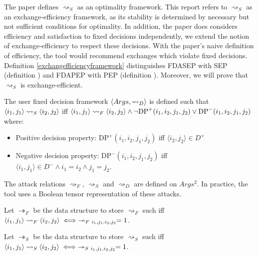 The paper \cite{aes} defines $\rightsquigarrow_S$ as an optimality framework. This report refers to $\rightsquigarrow_S$ as an exchange-efficiency framework, as its stability is determined by necessary but not sufficient conditions for optimality. In addition, the paper does considers efficiency and satisfaction to fixed decisions independently, we extend the notion of exchange-efficiency to respect these decisions. With the paper's naive definition of efficiency, the tool would recommend exchanges which violate fixed decisions. Definition \ref{exchangefficiencyframework} distinguishes FDASEP with SEP (definition \cite{sep}) and FDAPEP with PEP (definition \cite{pep}). Moreover, we will prove that $\rightsquigarrow_S$ is exchange-efficient.

\begin{definition}
	\label{fixeddecisionframework}
	
	The user fixed decision framework $\langle{Args},{\rightsquigarrow_D}\rangle$ is defined such that $\langle{i_1},{j_1}\rangle\rightsquigarrow_S\langle{ i_2},{j_2}\rangle$ iff $\langle{i_1},{j_1}\rangle\rightsquigarrow_F\langle{i_2},{j_2}\rangle\land\neg\text{DP}^+(i_1,i_2,j_1,j_2)\lor\text{DP}^-(i_1,i_2,j_1,j_2)$ where:
	\begin{itemize}
		\item Positive decision property: $\text{DP}^+(i_1,i_2,j_1,j_2)$ iff $\langle i_2, j_2\rangle\in D^+$
		\item Negative decision property: $\text{DP}^-(i_1,i_2,j_1,j_2)$ iff $\langle i_1, j_1\rangle\in D^-\land i_1=i_2\land j_1=j_2$.
	\end{itemize}
\end{definition}

The attack relations $\rightsquigarrow_F$, $\rightsquigarrow_S$ and $\rightsquigarrow_D$ are defined on $Args^2$. In practice, the tool uses a Boolean tensor representation of these attacks.

\begin{definition}
	Let $\twoheadrightarrow_F$ be the data structure to store $\rightsquigarrow_F$ such iff $\pair{i_1}{j_1}\rightsquigarrow_F\pair{i_2}{j_2}\iff\twoheadrightarrow_{F\ i_1,j_1,i_2,j_2}=1$.
\end{definition}

\begin{definition}
	Let $\twoheadrightarrow_S$ be the data structure to store $\rightsquigarrow_S$ such iff $\pair{i_1}{j_1}\rightsquigarrow_S\pair{i_2}{j_2}\iff\twoheadrightarrow_{S\ i_1,j_1,i_2,j_2}=1$.
\end{definition}

